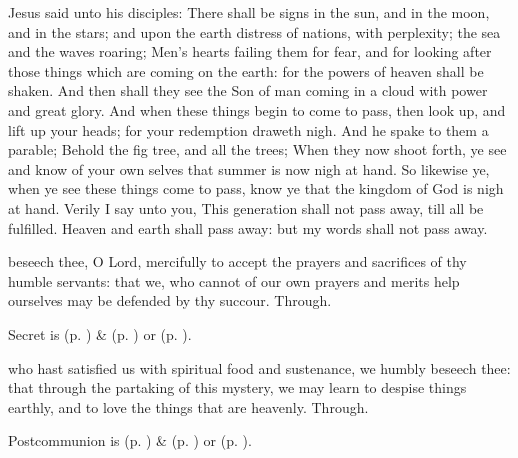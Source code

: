 
 Jesus said unto his disciples: There shall be signs in the sun, and in the moon, and in the stars; and upon the earth distress of nations, with perplexity; the sea and the waves roaring; Men's hearts failing them for fear, and for looking after those things which are coming on the earth: for the powers of heaven shall be shaken. And then shall they see the Son of man coming in a cloud with power and great glory. And when these things begin to come to pass, then look up, and lift up your heads; for your redemption draweth nigh. And he spake to them a parable; Behold the fig tree, and all the trees; When they now shoot forth, ye see and know of your own selves that summer is now nigh at hand. So likewise ye, when ye see these things come to pass, know ye that the kingdom of God is nigh at hand. Verily I say unto you, This generation shall not pass away, till all be fulfilled. Heaven and earth shall pass away: but my words shall not pass away.

\secret
{} beseech thee, O Lord, mercifully to accept the prayers and sacrifices of thy humble servants: that we, who cannot of our own prayers and merits help ourselves may be defended by thy succour. Through.
\begin{rubric}
     Secret is  (p. \pageref{SPMaryInAdvent}) \&   (p. \pageref{SPAgainst}) or  (p. \pageref{SPChiefBishop}).
\end{rubric}


\postcommunion
{} who hast satisfied us with spiritual food and sustenance, we humbly beseech thee: that through the partaking of this mystery, we may learn to despise things earthly, and to love the things that are heavenly. Through.
\begin{rubric}
     Postcommunion is  (p. \pageref{SPMaryInAdvent}) \&   (p. \pageref{SPAgainst}) or  (p. \pageref{SPChiefBishop}).
\end{rubric}


